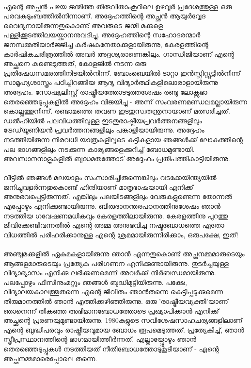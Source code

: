 \paragraph{}

എന്റെ അച്ഛൻ പഴയ ജന്മിത്ത തിരുവിതാംകൂറിലെ ഉഴവൂർ പ്രദേശത്തുള്ള ഒരു പരവകുടുംബത്തിൽനിന്നാണ്. അദ്ദേഹത്തിന്റെ അച്ഛൻ ആയുർവ്വേദ വൈദ്യനായിരുന്നതുകൊണ്ട് അവരുടെ ജന്മി മക്കളെ പള്ളിക്കൂടത്തിലയയ്ക്കാനനുവദിച്ചു. അദ്ദേഹത്തിന്റെ സഹോദരന്മാർ ജനസമ്മതിയാർജ്ജിച്ച കർഷകനേതാക്കളായിരുന്നു, കേരളത്തിന്റെ കാർഷികചരിത്രത്തിൽ അവർ അദൃശ്യരാണെങ്കിലും. ഗാന്ധിജിയാണ് എന്റെ അച്ഛനെ കണ്ടെടുത്തത്, കോളജിൽ നടന്ന ഒരു പ്രതിഷേധസമരത്തിനിടയിൽനിന്ന്. ബോംബെയിൽ ടാറ്റാ ഇൻസ്റ്റിറ്റ്യൂട്ടിൽനിന്ന് സാമൂഹ്യശാസ്ത്രം പഠിച്ചിറങ്ങിയ ആദ്യ വിദ്യാർത്ഥികളിലൊരാളായിരുന്നു അദ്ദേഹം. സോഷ്യലിസ്റ്റ് രാഷ്ട്രീയത്തോടടുത്തശേഷം രണ്ടു ലോക്സഭാ തെരഞ്ഞെടുപ്പുകളിൽ അദ്ദേഹം വിജയിച്ചു - അന്ന് സംവരണമണ്ഡലമല്ലായിരുന്ന കൊല്ലത്തുനിന്ന്. രണ്ടാമത്തെ തവണ ഇടതുസ്വതന്ത്രനായാണ് മത്സരിച്ചത്. ഡൽഹിയിൽ പലവിധത്തിലുള്ള ഇടതുരാഷ്ട്രീയപ്രവർത്തനങ്ങളിലും ട്രേഡ്‌യൂണിയൻ പ്രവർത്തനങ്ങളിലും പങ്കാളിയായിരുന്നു. അദ്ദേഹം നടത്തിയിരുന്ന നിരവധി യാത്രകളിലൂടെ കുട്ടികളായ ഞങ്ങൾക്ക് ലോകത്തിന്റെ പല ഭാഗങ്ങളിലും നടക്കുന്ന കാര്യങ്ങളെക്കുറിച്ച് ബോധമുണ്ടായി. അവസാനനാളുകളിൽ ബുദ്ധമതത്തോട് അദ്ദേഹം പ്രതിപത്തികാട്ടിയിരുന്നു.
\paragraph{}

വീട്ടിൽ ഞങ്ങൾ മലയാളം സംസാരിച്ചിരുന്നെങ്കിലും വടക്കേയിന്ത്യയിൽ ജനിച്ചുവളർന്നതുകൊണ്ട് ഹിന്ദിയാണ് മാതൃഭാഷയായി എനിക്ക് അനുഭവപ്പെട്ടിരുന്നത്. എങ്കിലും പലയിടങ്ങളിലും വേരുകളുണ്ടെന്ന തോന്നൽ എപ്പോഴും എനിക്കുണ്ടായിരുന്നു. ബിരുദാനന്തരപഠനത്തിനുശേഷം ഞാൻ നടത്തിയ ഗവേഷണമധികവും കേരളത്തിലായിരുന്നു. കേരളത്തിനു പുറത്തു ജീവിക്കേണ്ടിവന്നതിൽ എന്റെ അമ്മ അനുഭവിച്ച നഷ്ടബോധത്തെ ഏതോ വിധത്തിൽ പരിഹരിക്കാനുള്ള എന്റെ ശ്രമമായിരുന്നിരിക്കാം, ഒരുപക്ഷേ, ഇത്!
\paragraph{}

അഞ്ചുമക്കളിൽ ഏകമകളായിരുന്നു ഞാൻ എന്നതുകൊണ്ട് അച്ഛനമ്മമാരുടെയും ആങ്ങളമാരുടെയും പ്രത്യേക പരിഗണന എനിക്കുണ്ടായിരുന്നു. തുടർച്ചയുള്ള വിദ്യാഭ്യാസം എനിക്കു ലഭിക്കണമെന്ന് അവർക്ക് നിർബന്ധമായിരുന്നു. പലപ്പോഴും ഫീസിനുംമറ്റും ഞങ്ങൾ ബുദ്ധിമുട്ടിയിരുന്നു. പക്ഷേ, വിദ്യാലയകാലത്തുതന്നെ എന്റെ ജീവിതം ഞാൻതന്നെ കെട്ടിപ്പടുക്കുമെന്ന തീരുമാനത്തിൽ ഞാൻ എത്തിക്കഴിഞ്ഞിരുന്നു. ഒരു 'രാഷ്ട്രീയവ്യക്തി'യാണ് ഞാനെന്ന് തികഞ്ഞ അഭിമാനബോധത്തോടെ പ്രഖ്യാപിക്കാൻ എനിക്ക് അച്ഛന്റെ പ്രരണയുമുണ്ടായിരുന്നു. 1980കളുടെ സവിശേഷസാഹചര്യങ്ങളിലാണ് എന്റെ ബുദ്ധിപരവും രാഷ്ട്രീയവുമായ ബോധം രൂപമെടുത്തത്. പ്രത്യേകിച്ച്, ഞാൻ സ്ത്രീപ്രസ്ഥാനത്തിന്റെ ഭാഗമായിത്തീർന്നത്. എല്ലായ്പ്പോഴും ഞാൻ തെരഞ്ഞെടുപ്പുകൾ നടത്തിയത് നീതിബോധത്തോടുകൂടിയാണ് - എന്റെ അച്ഛനമ്മമാരെപ്പോലെ തന്നെ.
